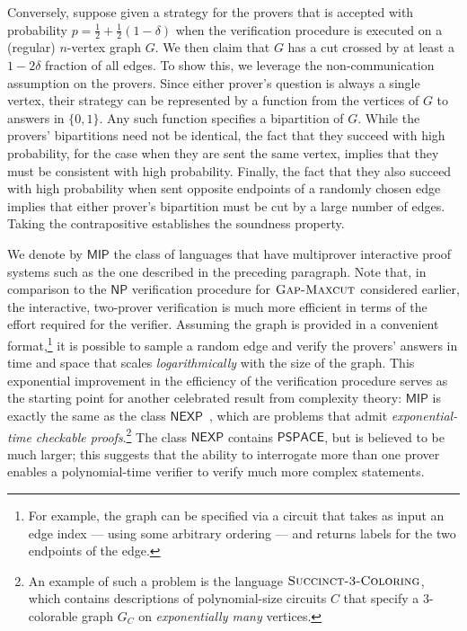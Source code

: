 \documentclass[11pt]{article}
\theoremstyle{definition}
\newcommand{\GX}{\textsc{Gap-Maxcut}}
\newcommand{\class}[1]{\ensuremath{\mathsf{#1}}\xspace}
\newcommand{\NP}{\class{NP}} \newcommand{\IP}{\class{IP}} \newcommand{\EXP}{\class{EXP}} \newcommand{\NEXP}{\class{NEXP}} \newcommand{\QMA}{\class{QMA}} \newcommand{\QMIP}{\class{QMIP}} \WithSuffix\newcommand\QMIP*{\ensuremath{\class{QMIP}^*}} \newcommand{\PSPACE}{\class{PSPACE}} \newcommand{\PCP}{\class{PCP}} \newcommand{\MIP}{\class{MIP}} \newcommand{\MIPco}{\class{MIP}^{\mathrm{co}}} \newcommand{\RE}{\class{RE}} \newcommand{\coRE}{\class{coRE}}
\begin{document}
Conversely, suppose given a strategy for the provers that is accepted with probability $p = \frac{1}{2} + \frac{1}{2}(1-\delta)$ when the verification procedure is executed on a (regular) $n$-vertex graph $G$. 
We then claim that $G$ has a cut crossed by at least a $1-2\delta$ fraction of all edges. To show this, we leverage the non-communication assumption on the provers. Since either prover's question is always a single vertex, their strategy can be represented by a function from the vertices of $G$ to answers in $\{0,1\}$. Any such function specifies a bipartition of $G$. While the provers'  bipartitions need not be identical, the fact that they succeed with high probability, for the case when they are sent the same vertex, implies that they must be consistent with high probability. Finally, the fact that they also succeed with high probability when sent opposite endpoints of a randomly chosen edge implies that either prover's bipartition must be cut by a large number of edges. Taking the contrapositive establishes the soundness property.

We denote by $\MIP$ the class of languages that have multiprover interactive proof systems such as the one described in the preceding paragraph. 
Note that, in comparison to the $\NP$ verification procedure for $\GX$ considered earlier, the interactive, two-prover verification is much more efficient in terms of the effort required for the verifier.
 Assuming the graph is provided in a convenient format,\footnote{For example, the graph can be specified via a circuit that takes as input an edge index --- using some arbitrary ordering --- and returns labels for the two endpoints of the edge.} it is possible to sample a random edge and verify the provers' answers in time and space that scales \emph{logarithmically} with the size of the graph. This exponential improvement in the efficiency of the verification procedure serves as the starting point for another celebrated result from complexity theory: $\mathsf{MIP}$ is exactly the same as the class $\mathsf{NEXP}$~\cite{babai1991non}, which are problems that admit \emph{exponential-time checkable proofs}.\footnote{An example of such a problem is the language $\textsc{Succinct-3-Coloring}$, which contains descriptions of polynomial-size circuits $C$ that specify a $3$-colorable graph $G_C$ on \emph{exponentially many} vertices.} The class $\NEXP$ contains $\PSPACE$, but is believed to be much larger; this suggests that the ability to interrogate more than one prover enables a polynomial-time verifier to verify much more complex statements.
 
\end{document}
